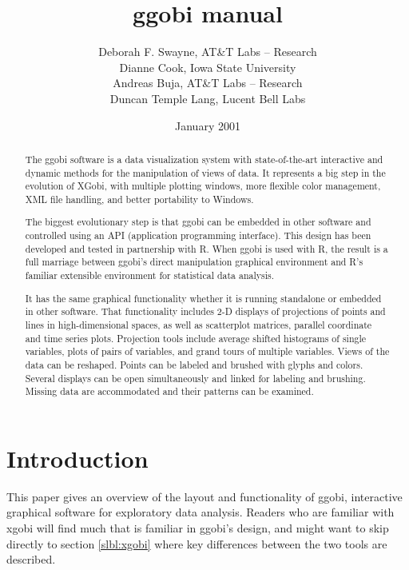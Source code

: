 \documentclass[11pt]{article}
\begin{document}
\title {ggobi manual}
\author{
Deborah F. Swayne, AT\&T Labs -- Research \\
Dianne Cook, Iowa State University \\
Andreas Buja, AT\&T Labs -- Research \\
Duncan Temple Lang, Lucent Bell Labs
}
\date{January 2001}

\maketitle


\begin{abstract}

The ggobi software is a data visualization system with state-of-the-art
interactive and dynamic methods for the manipulation of views of
data.  It represents a big step in the evolution of XGobi, with
multiple plotting windows, more flexible color management, XML file
handling, and better portability to Windows.

The biggest evolutionary step is that ggobi can be embedded in other
software and controlled using an API (application programming
interface).  This design has been developed and tested in partnership
with R.  When ggobi is used with R, the result is a full marriage
between ggobi's direct manipulation graphical environment and R's
familiar extensible environment for statistical data analysis.

It has the same graphical functionality whether it is running
standalone or embedded in other software.  That functionality
includes 2-D displays of projections of points and lines in
high-dimensional spaces, as well as scatterplot matrices, parallel
coordinate and time series plots.  Projection tools include average
shifted histograms of single variables, plots of pairs of variables,
and grand tours of multiple variables.  Views of the data can be
reshaped.  Points can be labeled and brushed with glyphs and colors.
Several displays can be open simultaneously and linked for labeling
and brushing.  Missing data are accommodated and their patterns can
be examined.
\end{abstract}

\section{Introduction}

This paper gives an overview of the layout and functionality of ggobi,
interactive graphical software for exploratory data analysis.  Readers
who are familiar with xgobi will find much that is familiar in ggobi's
design, and might want to skip directly to section \ref{slbl:xgobi}
where key differences between the two tools are described.
\end{document}
